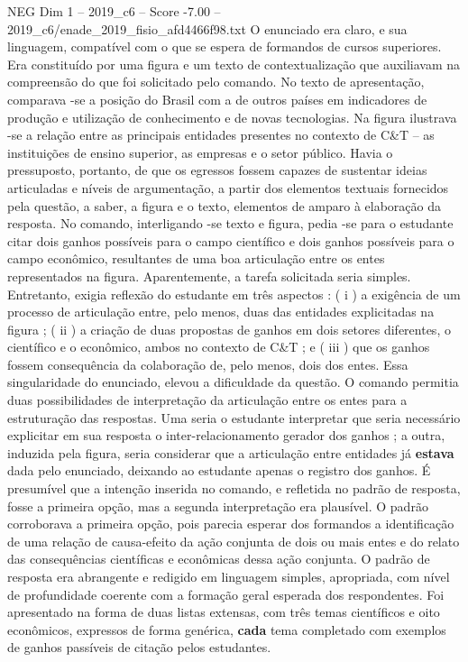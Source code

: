 \begin{textsample}{NEG Dim 1 – 2019\_c6 – Score -7.00 – 2019\_c6/enade\_2019\_fisio\_afd4466f98.txt}
O enunciado era claro, e sua linguagem, compatível com o que se espera de formandos de cursos superiores.
Era constituído por uma figura e um texto de contextualização que auxiliavam na compreensão do que foi solicitado pelo comando.
No texto de apresentação, comparava -se a posição do Brasil com a de outros países em indicadores de produção e utilização de conhecimento e de novas tecnologias.
Na figura ilustrava -se a relação entre as principais entidades presentes no contexto de C\&T – as instituições de ensino superior, as empresas e o setor público.
Havia o pressuposto, portanto, de que os egressos fossem capazes de sustentar ideias articuladas e níveis de argumentação, a partir dos elementos textuais fornecidos pela questão, a saber, a figura e o texto, elementos de amparo à elaboração da resposta.
No comando, interligando -se texto e figura, pedia -se para o estudante citar dois ganhos possíveis para o campo científico e dois ganhos possíveis para o campo econômico, resultantes de uma boa articulação entre os entes representados na figura.
Aparentemente, a tarefa solicitada seria simples.
Entretanto, exigia reflexão do estudante em três aspectos : ( i ) a exigência de um processo de articulação entre, pelo menos, duas das entidades explicitadas na figura ; ( ii ) a criação de duas propostas de ganhos em dois setores diferentes, o científico e o econômico, ambos no contexto de C\&T ; e ( iii ) que os ganhos fossem consequência da colaboração de, pelo menos, dois dos entes.
Essa singularidade do enunciado, elevou a dificuldade da questão.
O comando permitia duas possibilidades de interpretação da articulação entre os entes para a estruturação das respostas.
Uma seria o estudante interpretar que seria necessário explicitar em sua resposta o inter-relacionamento gerador dos ganhos ; a outra, induzida pela figura, seria considerar que a articulação entre entidades já \textbf{estava} dada pelo enunciado, deixando ao estudante apenas o registro dos ganhos.
É presumível que a intenção inserida no comando, e refletida no padrão de resposta, fosse a primeira opção, mas a segunda interpretação era plausível.
O padrão corroborava a primeira opção, pois parecia esperar dos formandos a identificação de uma relação de causa-efeito da ação conjunta de dois ou mais entes e do relato das consequências científicas e econômicas dessa ação conjunta.
O padrão de resposta era abrangente e redigido em linguagem simples, apropriada, com nível de profundidade coerente com a formação geral esperada dos respondentes.
Foi apresentado na forma de duas listas extensas, com três temas científicos e oito econômicos, expressos de forma genérica, \textbf{cada} tema completado com exemplos de ganhos passíveis de citação pelos estudantes.

\end{textsample}
